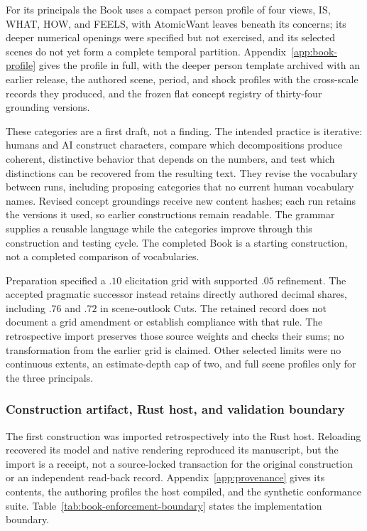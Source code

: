 \documentclass[11pt,a4paper]{article}
\begin{document}
For its principals the Book uses a compact person profile of four views, IS,
WHAT, HOW, and FEELS, with AtomicWant leaves beneath its concerns; its deeper
numerical openings were specified but not exercised, and its selected scenes do
not yet form a complete temporal partition. Appendix~\ref{app:book-profile}
gives the profile in full, with the deeper person template archived with an
earlier release, the authored scene, period, and shock profiles with the
cross-scale records they produced, and the frozen flat concept registry of
thirty-four grounding versions.

These categories are a first draft, not a finding. The intended practice is
iterative: humans and AI construct characters, compare which decompositions
produce coherent, distinctive behavior that depends on the numbers, and test
which distinctions can be recovered from the resulting text. They revise the
vocabulary between runs, including proposing categories that no current human
vocabulary names. Revised concept groundings receive new content hashes; each
run retains the versions it used, so earlier constructions remain readable.
The grammar supplies a reusable language while the categories improve through
this construction and testing cycle. The completed Book is a starting construction, not a
completed comparison of vocabularies.

Preparation specified a $.10$ elicitation grid with supported $.05$ refinement.
The accepted pragmatic successor instead retains directly authored decimal
shares, including $.76$ and $.72$ in scene-outlook Cuts. The retained record
does not document a grid amendment or establish compliance with that rule.
The retrospective import preserves those source weights and checks their sums;
no transformation from the earlier grid is claimed. Other selected limits were
no continuous extents, an estimate-depth cap of two, and full scene profiles
only for the three principals.

\subsubsection{Construction artifact, Rust host, and validation boundary}

The first construction was imported retrospectively into the Rust host.
Reloading recovered its model and native rendering reproduced its manuscript,
but the import is a receipt, not a source-locked transaction for the original
construction or an independent read-back record. Appendix~\ref{app:provenance}
gives its contents, the authoring profiles the host compiled, and the synthetic
conformance suite. Table~\ref{tab:book-enforcement-boundary} states the
implementation boundary.
\end{document}
